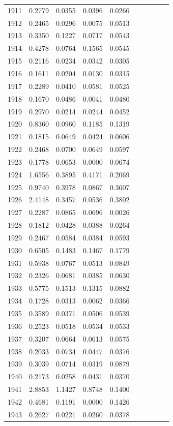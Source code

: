 \begin{table}
\begin{tabular}{cccccccccc}
1911& 0.2779& 0.0355& 0.0396& 0.0266\\ 
1912& 0.2465& 0.0296& 0.0075& 0.0513\\ 
1913& 0.3350& 0.1227& 0.0717& 0.0543\\ 
1914& 0.4278& 0.0764& 0.1565& 0.0545\\ 
1915& 0.2116& 0.0234& 0.0342& 0.0305\\ 
1916& 0.1611& 0.0204& 0.0130& 0.0315\\ 
1917& 0.2289& 0.0410& 0.0581& 0.0525\\ 
1918& 0.1670& 0.0486& 0.0041& 0.0480\\ 
1919& 0.2970& 0.0214& 0.0244& 0.0452\\ 
1920& 0.8360& 0.0960& 0.1185& 0.1319\\ 
1921& 0.1815& 0.0649& 0.0424& 0.0606\\ 
1922& 0.2468& 0.0700& 0.0649& 0.0597\\ 
1923& 0.1778& 0.0653& 0.0000& 0.0674\\ 
1924& 1.6556& 0.3895& 0.4171& 0.2069\\ 
1925& 0.9740& 0.3978& 0.0867& 0.3607\\ 
1926& 2.4148& 0.3457& 0.0536& 0.3802\\ 
1927& 0.2287& 0.0865& 0.0696& 0.0026\\ 
1928& 0.1812& 0.0428& 0.0388& 0.0264\\ 
1929& 0.2467& 0.0584& 0.0384& 0.0593\\ 
1930& 0.6505& 0.1483& 0.1467& 0.1779\\ 
1931& 0.5938& 0.0767& 0.0513& 0.0849\\ 
1932& 0.2326& 0.0681& 0.0385& 0.0630\\ 
1933& 0.5775& 0.1513& 0.1315& 0.0882\\ 
1934& 0.1728& 0.0313& 0.0062& 0.0366\\ 
1935& 0.3589& 0.0371& 0.0506& 0.0539\\ 
1936& 0.2523& 0.0518& 0.0534& 0.0533\\ 
1937& 0.3207& 0.0664& 0.0613& 0.0575\\ 
1938& 0.2033& 0.0734& 0.0447& 0.0376\\ 
1939& 0.3039& 0.0714& 0.0319& 0.0879\\ 
1940& 0.2173& 0.0258& 0.0431& 0.0370\\ 
1941& 2.8853& 1.1427& 0.8748& 0.1400\\ 
1942& 0.4681& 0.1191& 0.0000& 0.1426\\ 
1943& 0.2627& 0.0221& 0.0260& 0.0378\\ 

\end{tabular}
\end{table}

